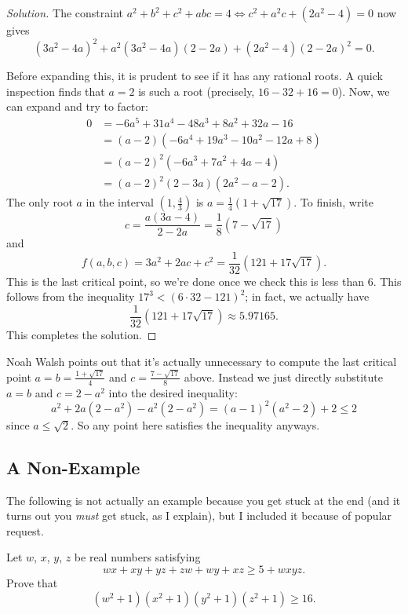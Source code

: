 \documentclass[11pt]{scrartcl}
\begin{document}
\begin{proof}[Solution]
The constraint $a^2+b^2+c^2+abc=4 \iff c^2 + a^2c + (2a^2-4) = 0$ now gives
\[ \left( 3a^2-4a \right)^2
  + a^2 \left( 3a^2-4a \right)\left( 2-2a \right)
  + \left( 2a^2-4 \right)\left( 2-2a \right)^2 = 0. \]

Before expanding this,
it is prudent to see if it has any rational roots.
A quick inspection finds that $a=2$ is such a root
(precisely, $16-32+16=0$).
Now, we can expand and try to factor:
\begin{align*}
  0 &= -6a^5 + 31a^4 - 48a^3 + 8a^2 + 32a - 16 \\
  &= (a-2)(-6a^4 + 19a^3 - 10a^2 - 12a + 8) \\
  &= (a-2)^2 \left( -6a^3+7a^2+4a-4 \right) \\
  &= (a-2)^2 (2-3a)(2a^2-a-2).
\end{align*}
The only root $a$ in the interval $\left( 1,\tfrac43 \right)$
is $a = \frac 14 \left( 1 + \sqrt{17} \right)$.
To finish, write
\[ c = \frac{a(3a-4)}{2-2a}
  = \frac{1}{8} \left( 7 - \sqrt{17} \right) \]
and
\[ f(a,b,c) = 3a^2+2ac+c^2
  = \frac{1}{32} \left( 121 + 17\sqrt{17} \right). \]
This is the last critical point, so we're done once we check this is less than $6$.
This follows from the inequality $17^3 < (6 \cdot 32 - 121)^2$;
in fact, we actually have
\[ \frac{1}{32} \left( 121 + 17\sqrt{17} \right)
  \approx 5.97165. \]
This completes the solution.
\end{proof}
\begin{remark*}
  Noah Walsh points out that it's actually unnecessary to compute the last critical point
  $a = b = \frac{1+\sqrt{17}}{4}$ and $c = \frac{7-\sqrt{17}}{8}$ above.
  Instead we just directly substitute $a=b$ and $c=2-a^2$ into the desired inequality:
  \[ a^2+2a(2-a^2)-a^2(2-a^2) = (a-1)^2(a^2-2) + 2 \le 2 \]
  since $a \le \sqrt 2$.
  So any point here satisfies the inequality anyways.
\end{remark*}

\subsection{A Non-Example}
The following is not actually an example because you get stuck at the end
(and it turns out you \emph{must} get stuck, as I explain),
but I included it because of popular request.
\begin{example}
  [USAMO 2014/1] Let $w$, $x$, $y$, $z$ be real numbers satisfying
  \[ wx+xy+yz+zw+wy+xz \ge 5 + wxyz. \]
  Prove that
  \[ (w^2+1)(x^2+1)(y^2+1)(z^2+1) \ge 16. \]
\end{example}
\end{document}
